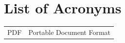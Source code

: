 \chapter*{List of Acronyms}
\begingroup
\renewcommand{\arraystretch}{1.25}
\begin{longtable}{@{}p{2.6cm}p{\dimexpr\textwidth-3.2cm\relax}@{}}
PDF  & Portable Document Format \\
\end{longtable}
\endgroup
